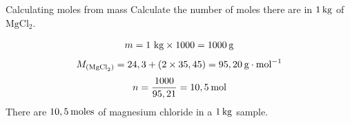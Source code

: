             \label{m38717*secfhsst!!!underscore!!!id641} 
      \begin{wex}{Calculating moles from mass }
{
      \label{m38717*id278755}Calculate the number of moles there are in $1\phantom{\rule{2pt}{0ex}}\text{kg}$ of $\text{MgCl}{}_{2}$.
     }
{


\label{m38717*id278854}\nopagebreak\noindent{}
    \begin{equation*}
    m=1~\text{kg}\ensuremath{\times}1 000=1 000\phantom{\rule{2pt}{0ex}}\text{g}
      \end{equation*}
\label{m38717*id278912}\nopagebreak\noindent{}
    \begin{equation*}
    {M}_{\left({\text{MgCl}}_{2}\right)}=24,3 + \left(2\ensuremath{\times}35,45\right) = 95,20\phantom{\rule{2pt}{0ex}}\text{g}\ensuremath{\cdot}{\text{mol}}^{-1}
      \end{equation*}    
      \label{m38717*id279005}\nopagebreak\noindent{}
    \begin{equation*}
    n=\frac{1000}{95,21}=10,5\phantom{\rule{2pt}{0ex}}\text{mol}
      \end{equation*}
      \label{m38717*id279046}There are $10,5\phantom{\rule{2pt}{0ex}}\text{moles}$ of magnesium chloride in a $1\phantom{\rule{2pt}{0ex}}\text{kg}$ sample.
}
    \end{wex}
\label{m38717*secfhsst!!!underscore!!!id832}
